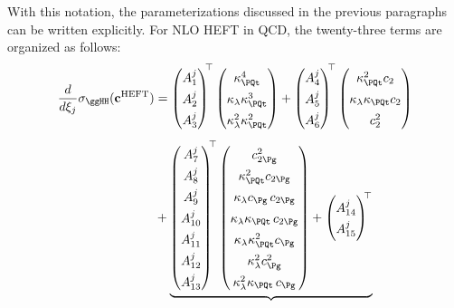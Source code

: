 With this notation, the parameterizations discussed in the previous paragraphs can be written explicitly. For NLO HEFT in QCD, the twenty-three terms are organized as follows:
%
\begin{equation}\label{eq:heft_diff}
\renewcommand{\arraystretch}{1.4}
\begin{split}
\frac{d}{d\xi_j}\sigma_{\ggHH}(\mathbf{c}^{\text{HEFT}}) &=
\begin{pmatrix} A^j_1 \\ A^j_2 \\ A^j_3 \end{pmatrix}^{\!\!\top}
\begin{pmatrix} \kappa_\PQt^4 \\ \kappa_{\lambda}\kappa_\PQt^3 \\ \kappa_{\lambda}^2 \kappa_\PQt^2  \end{pmatrix}
+
\begin{pmatrix} A^j_4 \\ A^j_5 \\ A^j_6 \end{pmatrix}^{\!\!\top}
\begin{pmatrix} \kappa_\PQt^2 c_2 \\ \kappa_{\lambda}\kappa_\PQt c_2 \\ c_2^2 \end{pmatrix} \\[4pt]
&+
\underbrace{
\begin{pmatrix}
A^j_7 \\ A^j_8 \\ A^j_9 \\ A^j_{10} \\ A^j_{11} \\ A^j_{12} \\ A^j_{13}
\end{pmatrix}^{\!\!\top}
\begin{pmatrix}
c_{2\Pg}^2 \\
\kappa_\PQt^2 c_{2\Pg} \\
\kappa_{\lambda}c_\Pg\, c_{2\Pg} \\
\kappa_{\lambda}\kappa_\PQt\, c_{2\Pg} \\
\kappa_{\lambda}\kappa_\PQt^2 c_\Pg \\
\kappa_{\lambda}^2 c_\Pg^2 \\
\kappa_{\lambda}^2\kappa_\PQt\, c_\Pg
\end{pmatrix}
+
\begin{pmatrix}
A^j_{14} \\ A^j_{15}
\end{pmatrix}^{\!\!\top}
}
\end{split}
\end{equation}
